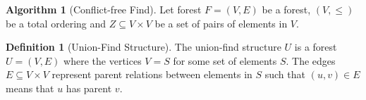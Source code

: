 \documentclass[a4paper,12pt]{article}
\theoremstyle{definition}
\newtheorem{definition}{Definition}[section]
\newtheorem{algorithm}{Algorithm}[section]
\begin{document}
\begin{algorithm}[Conflict-free Find]
    Let forest $F = (V, E)$ be a forest, $(V, \leq)$ be a total ordering and $Z
    \subseteq V \times V$ be a set of pairs of elements in $V$.
\end{algorithm}

\begin{definition}[Union-Find Structure]
    The union-find structure $U$ is a forest $U = (V, E)$ where the vertices $V
    = S$ for some set of elements $S$. The edges $E \subseteq V \times V$
    represent parent relations between elements in $S$ such that $(u, v) \in E$
    means that $u$ has parent $v$.
\end{definition}
\end{document}
